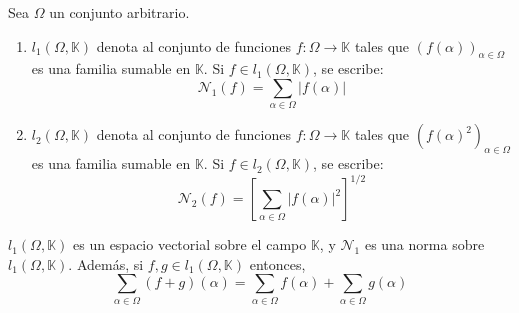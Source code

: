 \documentclass[12pt]{report}
\newcounter{it}
\theoremstyle{largebreak}
\newcommand\cf[3]{\ensuremath{#1:#2\rightarrow#3}}
\newcommand\abs[1]{\ensuremath{\big|#1\big|}}
\begin{document}
    \begin{mydef}
        Sea $\Omega$ un conjunto arbitrario.
        \begin{enumerate}
            \item $l_1(\Omega,\mathbb{K})$ denota al conjunto de funciones $\cf{f}{\Omega}{\mathbb{K}}$ tales que $\left(f(\alpha) \right)_{\alpha\in\Omega}$ es una familia sumable en $\mathbb{K}$. Si $f\in l_1(\Omega,\mathbb{K})$, se escribe:
            \begin{equation*}
                \mathcal{N}_1(f)=\sum_{\alpha\in\Omega }\abs{f(\alpha)}
            \end{equation*}
            \item $l_2(\Omega,\mathbb{K})$ denota al conjunto de funciones $\cf{f}{\Omega}{\mathbb{K}}$ tales que $\left(f(\alpha)^2 \right)_{\alpha\in\Omega}$ es una familia sumable en $\mathbb{K}$. Si $f\in l_2(\Omega,\mathbb{K})$, se escribe:
            \begin{equation*}
                \mathcal{N}_2(f)=\left[\sum_{\alpha\in\Omega }\abs{f(\alpha)}^2\right]^{1/2}
            \end{equation*}
        \end{enumerate}
    \end{mydef}

    \begin{propo}
        $l_1(\Omega,\mathbb{K})$ es un espacio vectorial sobre el campo $\mathbb{K}$, y $\mathcal{N}_1$ es una norma sobre $l_1(\Omega,\mathbb{K})$. Además, si $f,g\in l_1(\Omega,\mathbb{K})$ entonces,
        \begin{equation*}
            \sum_{\alpha\in\Omega }(f+g)(\alpha)=\sum_{\alpha\in\Omega }f(\alpha)+\sum_{\alpha\in\Omega }g(\alpha)
        \end{equation*}
    \end{propo}
\end{document}
